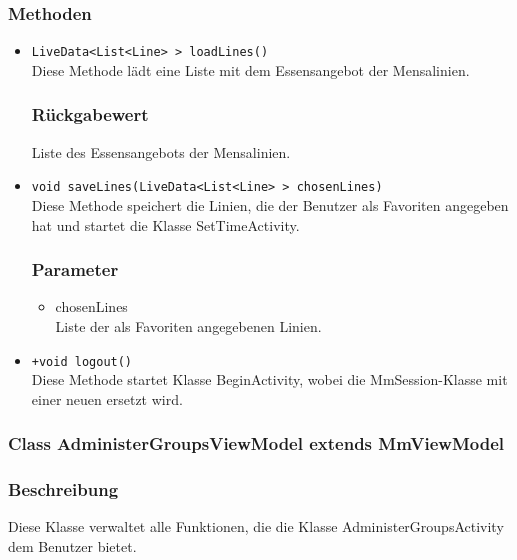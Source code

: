 \documentclass[a4paper]{scrreprt}
\begin{document}
\subsubsection*{Methoden}
\begin{addmargin}[25pt]{0pt}
\begin{itemize}

\item \texttt{LiveData<List<Line> > loadLines()}\\
	Diese Methode lädt eine Liste mit dem Essensangebot der Mensalinien. 

	\subsubsection*{Rückgabewert}
	Liste des Essensangebots der Mensalinien.

\item \texttt{void saveLines(LiveData<List<Line> > chosenLines)}\\
	Diese Methode speichert die Linien, die der Benutzer als Favoriten angegeben hat und startet die Klasse SetTimeActivity.
	\subsubsection*{Parameter}
	\begin{itemize}
	\item chosenLines \\
	Liste der als Favoriten angegebenen Linien.
	\end{itemize}

\item \texttt{+void logout()}\\
    Diese Methode startet Klasse BeginActivity, wobei die MmSession-Klasse mit einer neuen ersetzt wird.

\end{itemize}
\end{addmargin}


\subsubsection{Class AdministerGroupsViewModel extends MmViewModel}
\subsubsection*{Beschreibung}
Diese Klasse verwaltet alle Funktionen, die die Klasse AdministerGroupsActivity dem Benutzer bietet.
\end{document}
